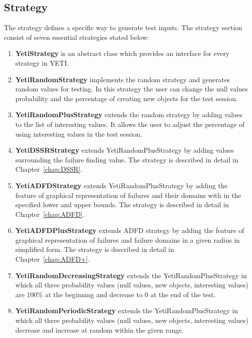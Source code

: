 \subsection{Strategy}
The strategy defines a specific way to generate test inputs. The strategy section consist of seven essential strategies stated below:
\begin{enumerate}
\item {\textbf{YetiStrategy}} is an abstract class which provides an interface for every strategy in YETI.
\item {\textbf{YetiRandomStrategy}} implements the random strategy and generates random values for testing. In this strategy the user can change the null values probability and the percentage of creating new objects for the test session. 
\item {\textbf{YetiRandomPlusStrategy}} extends the random strategy by adding values to the list of interesting values. It allows the user to adjust the percentage of using interesting values in the test session.
\item {\textbf{YetiDSSRStrategy}} extends YetiRandomPlusStrategy by adding values surrounding the failure finding value. The strategy is described in detail in Chapter~\ref{chap:DSSR}.
\item {\textbf{YetiADFDStrategy}} extends YetiRandomPlusStrategy by adding the feature of graphical representation of failures and their domains with in the specified lower and upper bounds. The strategy is described in detail in Chapter~\ref{chap:ADFD}.
\item {\textbf{YetiADFDPlusStrategy}} extends ADFD strategy by adding the feature of graphical representation of failures and failure domains in a given radius in simplified form. The strategy is described in detail in Chapter~\ref{chap:ADFD+}.
\item {\textbf{YetiRandomDecreasingStrategy}} extends the YetiRandomPlusStrategy in which all three probability values (null values, new objects, interesting values) are 100\% at the beginning and decrease to 0 at the end of the test.
\item {\textbf{YetiRandomPeriodicStrategy}} extends the YetiRandomPlusStrategy in which all three probability values (null values, new objects, interesting values) decrease and increase at random within the given range.
\end{enumerate}






